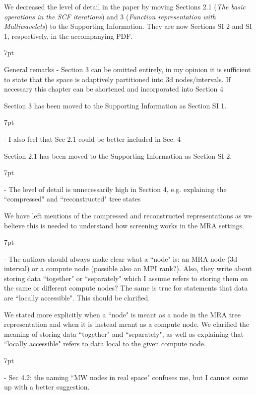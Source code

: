 \documentclass[11pt]{article}
\newenvironment{formal}{%
  \def\FrameCommand{%
    \hspace{1pt}%
    {\color{darkblue}\vrule width 2pt}%
    {\color{formalshade}\vrule width 4pt}%
    \colorbox{formalshade}%
  }%
  \MakeFramed{\advance\hsize-\width\FrameRestore}%
  \noindent\hspace{-4.55pt}%
  \begin{adjustwidth}{}{7pt}%
  \vspace{2pt}\vspace{2pt}%
}
{%
  \vspace{2pt}\end{adjustwidth}\endMakeFramed%
}
\begin{document}
We decreased the level of detail in the paper by moving Sections 2.1 (\emph{The basic operations in the SCF iterations}) and 3 (\emph{Function representation with Multiwavelets}) to the Supporting Information. They are now Sections SI 2 and SI 1, respectively, in the accompanying PDF.

\begin{formal}
General remarks
 - Section 3 can be omitted entirely, in my opinion it is sufficient to state that the space is adaptively partitioned into 3d nodes/intervals. If necessary this chapter can be shortened and incorporated into Section 4
 \end{formal}
 
 Section 3 has been moved to the Supporting Information as Section SI 1.
 
 \begin{formal}
 - I also feel that Sec 2.1 could be better included in Sec. 4
 \end{formal}
 
Section 2.1 has been moved to the Supporting Information as Section SI 2.
 
\begin{formal}
 - The level of detail is unnecessarily high in Section 4, e.g. explaining the ``compressed" and ``reconstructed" tree states
 \end{formal}
 
 We have left mentions of the compressed and reconstructed representations as we believe this is needed to understand how screening works in the MRA settings.
 
 \begin{formal}
 - The authors should always make clear what a ``node" is: an MRA node (3d interval) or a compute node (possible also an MPI rank?). Also, they write about storing data ``together" or ``separately" which I assume refers to storing them on the same or different compute nodes? The same is true for statements that data are ``locally accessible". This should be clarified.
 \end{formal}
 
 We stated more explicitly when a ``node" is meant as a node in the MRA tree representation and when it is instead meant as a compute node. 
 We clarified the meaning of storing data ``together" and ``separately", as well as explaining that ``locally accessible" refers to data local to the given compute node.
 
 

 \begin{formal}
 - Sec 4.2: the naming ``MW nodes in real space" confuses me, but I cannot come up with a better suggestion.
 \end{formal}
 
\end{document}
